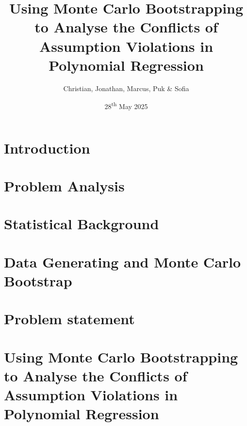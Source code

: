 \documentclass{article}
\title{Using Monte Carlo Bootstrapping to Analyse the Conflicts of Assumption Violations in Polynomial Regression\\}
\author{Christian, Jonathan, Marcus, Puk \& Sofia }
\date{28\textsuperscript{th} May 2025}
\begin{document}
	\setcounter{section}{0}
	
	
	\newpage
	\tableofcontents
	\newpage
	
	\section{Introduction}
	
	\newpage
	
	\section{Problem Analysis}
	
	\newpage
	\newpage
	\section{Statistical Background}
	
	
	\newpage
 	
	\newpage
	\section{Data Generating and Monte Carlo Bootstrap}
	
	\newpage
	
	\newpage
	
	\newpage
	\section{Problem statement}
	
	\newpage
%	
	
	
%	
	
	
%	
	
	
	\section{Using Monte Carlo Bootstrapping to Analyse the Conflicts of Assumption Violations in Polynomial Regression}
	
	\newpage
	
\end{document}
